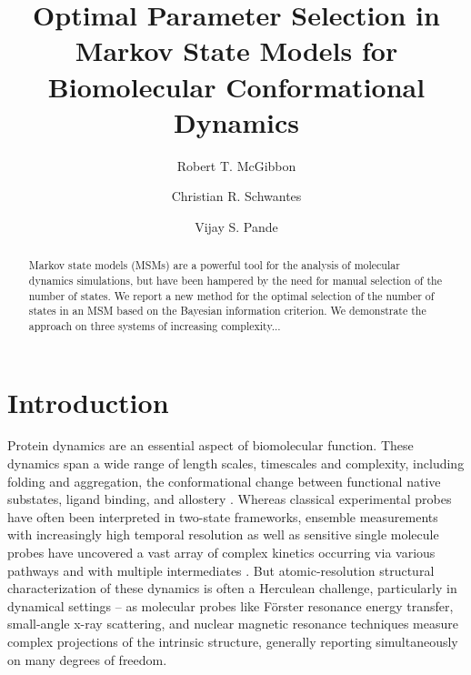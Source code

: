 \documentclass[twocolumn,floatfix,nofootinbib,aps]{revtex4-1}
\begin{document}
\title{Optimal Parameter Selection in Markov State Models for Biomolecular Conformational Dynamics}
\author{Robert T. McGibbon}
\author{Christian R. Schwantes}
\author{Vijay S. Pande}

\begin{abstract}
Markov state models (MSMs) are a powerful tool for the analysis of molecular dynamics simulations, but have been hampered by the need for manual selection of the number of states. We report a new method for the optimal selection of the number of states in an MSM based on the Bayesian information criterion. We demonstrate the approach on three systems of increasing complexity...
\end{abstract}

\maketitle

\section{Introduction}
Protein dynamics are an essential aspect of biomolecular function. These dynamics span a wide range of length scales, timescales and complexity, including folding and aggregation, the conformational change between functional native substates, ligand binding, and allostery \cite{Dobson2003Protein, Kim2008Real, Austin1975Dynamics, Bahar2007Intrinsic}. Whereas classical experimental probes have often been interpreted in two-state frameworks, ensemble measurements with increasingly high temporal resolution as well as sensitive single molecule probes have uncovered a vast array of complex kinetics occurring via various pathways and with multiple intermediates \cite{Cosa2006Evidence, Zhang2011Direct}. But atomic-resolution structural characterization of these dynamics is often a Herculean challenge, particularly in dynamical settings -- as molecular probes like F\"{o}rster resonance energy transfer, small-angle x-ray scattering, and nuclear magnetic resonance techniques measure complex projections of the intrinsic structure, generally reporting simultaneously on many degrees of freedom\cite{Mertens2010Structural, Tzeng2011Protein}.
\end{document}
